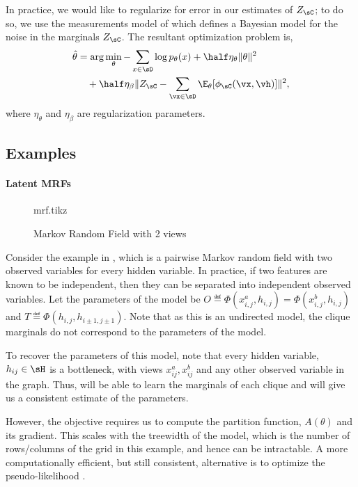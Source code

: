 In practice, we would like to regularize for error in our
  estimates of $Z_\sC$; to do so, we use the measurements model of
  \citet{liang09measurements} which defines a Bayesian model for the noise
  in the marginals $Z_\sC$. The resultant optimization problem is,
\begin{align*}
  \hat\theta 
  &= \arg\min_\theta - \sum_{x \in \sD} \log p_\theta(x) + \half \eta_\theta \| \theta \|^2 \\
  &\quad + \half \eta_\beta \| Z_\sC - \sum_{\vx \in \sD} \E_{\theta}[\phi_\sC(\vx,\vh)] \|^2,
\end{align*}
where $\eta_\theta$ and $\eta_\beta$ are regularization parameters. 

\subsection{Examples}

\paragraph{Latent MRFs}

\begin{figure}
  \label{fig:examples-mrf}
  \centering
  {mrf.tikz}
  \caption{Markov Random Field with 2 views}
\end{figure}

Consider the example in , which is a pairwise Markov
  random field with two observed variables for every hidden variable. 
In practice, if two features are known to be independent, then they can
  be separated into independent observed variables.
Let the parameters of the model be $O \eqdef \Phi(x^a_{i,j}, h_{i,j})
  = \Phi(x^b_{i,j}, h_{i,j})$ and $T \eqdef \Phi(h_{i,j}, h_{i \pm 1,j \pm 1})$. 
Note that as this is an undirected model, the clique marginals do not
  correspond to the parameters of the model.

To recover the parameters of this model, note that every hidden
  variable, $h_{ij} \in \sH$ is a bottleneck, with views
  $x^{a}_{ij},x^{b}_{ij}$ and any other observed variable in the graph. 
Thus, \LearnMarginals will be able to learn the marginals of each clique
  and \LearnLogLinear will give us a consistent estimate of the
  parameters. 

However, the objective  requires us to compute the
  partition function, $A(\theta)$ and its gradient. 
This scales with the treewidth of the model, which is the number
  of rows/columns of the grid in this example, and hence can be
  intractable.
A more computationally efficient, but still consistent, alternative is
to optimize the pseudo-likelihood .


